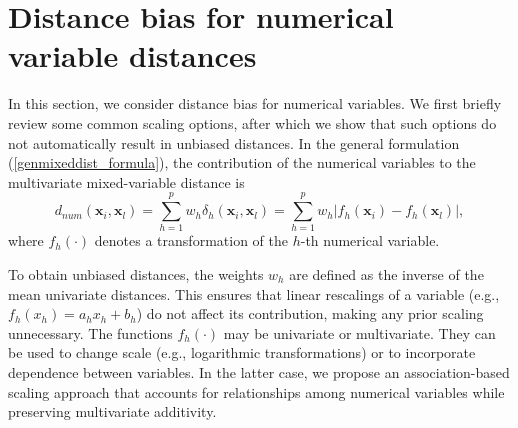 \documentclass[12pt]{article}
\begin{document}
\section{Distance bias for numerical variable distances}\label{sect:numdist}
In this section, we consider distance bias for numerical variables. We first briefly review some common scaling options, after which we show that such options do not automatically result in unbiased distances.
In the general formulation (\ref{genmixeddist_formula}), the contribution of the numerical variables to the multivariate mixed-variable distance is
\begin{equation}\label{gendistnumerical}
d_{num}(\mathbf{x}_{i},\mathbf{x}_{l}) = \sum_{h=1}^{p} w_{h} \delta_{h}(\mathbf{x}_{i}, \mathbf{x}_{l})= \sum_{h=1}^{p} w_h \lvert f_h(\mathbf{x}_i)-f_h(\mathbf{x}_l) \rvert,
\end{equation}
where $f_h(\cdot)$ denotes a transformation of the $h$-th numerical variable.

To obtain unbiased distances, the weights $w_h$ are defined as the inverse of the mean univariate distances. This ensures that linear rescalings of a variable (e.g., $f_h(x_h)=a_hx_h+b_h$) do not affect its contribution, making any prior scaling unnecessary. The functions $f_h(\cdot)$ may be univariate or multivariate. They can be used to change scale (e.g., logarithmic transformations) or to incorporate dependence between variables. In the latter case, we propose an association-based scaling approach that accounts for relationships among numerical variables while preserving multivariate additivity.
\end{document}

